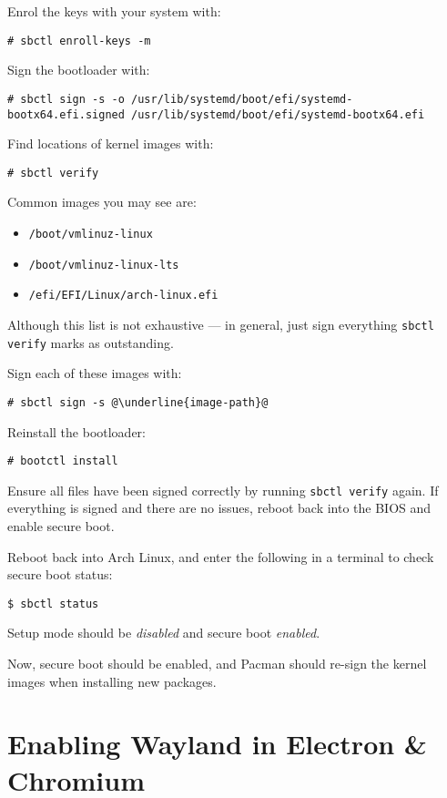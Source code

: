 \documentclass[a4paper]{article}
\begin{document}
Enrol the keys with your system with:
\begin{lstlisting}
# sbctl enroll-keys -m
\end{lstlisting}

Sign the bootloader with:
\begin{lstlisting}
# sbctl sign -s -o /usr/lib/systemd/boot/efi/systemd-bootx64.efi.signed /usr/lib/systemd/boot/efi/systemd-bootx64.efi
\end{lstlisting}

Find locations of kernel images with:
\begin{lstlisting}
# sbctl verify
\end{lstlisting}

Common images you may see are:
\begin{itemize}
    \item \lstinline|/boot/vmlinuz-linux|
    \item \lstinline|/boot/vmlinuz-linux-lts|
    \item \lstinline|/efi/EFI/Linux/arch-linux.efi|
\end{itemize}
Although this list is not exhaustive --- in general, just sign everything \lstinline|sbctl verify| marks as outstanding.

Sign each of these images with:
\begin{lstlisting}[escapechar=@]
# sbctl sign -s @\underline{image-path}@
\end{lstlisting}

Reinstall the bootloader:
\begin{lstlisting}
# bootctl install
\end{lstlisting}

Ensure all files have been signed correctly by running \lstinline|sbctl verify| again.
If everything is signed and there are no issues, reboot back into the BIOS and enable secure boot.

Reboot back into Arch Linux, and enter the following in a terminal to check secure boot status:
\begin{lstlisting}
$ sbctl status
\end{lstlisting}

Setup mode should be \emph{disabled} and secure boot \emph{enabled}.

Now, secure boot should be enabled, and Pacman should re-sign the kernel images when installing new packages.


\section{Enabling Wayland in Electron \& Chromium}
\end{document}
